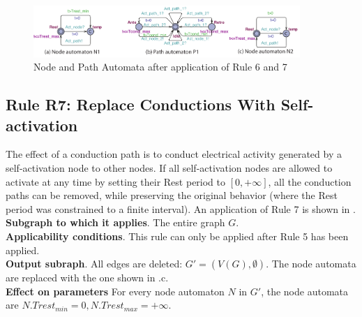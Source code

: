 \begin{figure}[!t]
	\centering
	\includegraphics[width=0.9\textwidth]{figs/rule5.pdf}
	\caption{\small Node and Path Automata after application of Rule 6 and 7}
	\label{fig:rule5}
\end{figure}

\subsection{Rule R7: Replace Conductions With Self-activation}
The effect of a conduction path is to conduct electrical activity generated by a self-activation node to other nodes. 
If all self-activation nodes are allowed to activate at any time by setting their Rest period to $[0,+\infty]$, all the conduction paths can be removed, while preserving the original behavior (where the Rest period was constrained to a finite interval).
An application of Rule 7 is shown in .
\textbf{Subgraph to which it applies}.
The entire graph $G$.\\
\textbf{Applicability conditions}.
This rule can only be applied after Rule 5 has been applied.\\
\textbf{Output subraph}.
All edges are deleted: $G' = (V(G), \emptyset)$. The node automata are replaced with the one shown in .c.\\
\textbf{Effect on parameters}
For every node automaton $N$ in $G'$, the node automata are $N.Trest_{min}=0,N.Trest_{max} = +\infty$.\\


%

